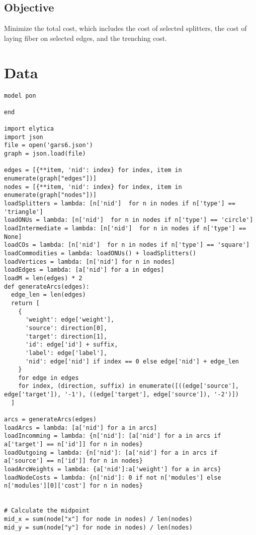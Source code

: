 \documentclass{article}
\begin{document}
\subsection{Objective}
Minimize the total cost, which includes the cost of selected splitters, the cost of laying fiber on selected edges, and the trenching cost.

\section{Data}

\begin{lstlisting}[style=custompython, caption=Python Code for PON Model]
model pon

end

import elytica
import json
file = open('gars6.json')
graph = json.load(file)

edges = [{**item, 'nid': index} for index, item in enumerate(graph["edges"])]
nodes = [{**item, 'nid': index} for index, item in enumerate(graph["nodes"])]
loadSplitters = lambda: [n['nid']  for n in nodes if n['type'] == 'triangle']
loadONUs = lambda: [n['nid']  for n in nodes if n['type'] == 'circle']
loadIntermediate = lambda: [n['nid']  for n in nodes if n['type'] == None]
loadCOs = lambda: [n['nid']  for n in nodes if n['type'] == 'square']
loadCommodities = lambda: loadONUs() + loadSplitters()
loadVertices = lambda: [n['nid'] for n in nodes]
loadEdges = lambda: [a['nid'] for a in edges]
loadM = len(edges) * 2
def generateArcs(edges):
  edge_len = len(edges)
  return [
    {
      'weight': edge['weight'],
      'source': direction[0],
      'target': direction[1],
      'id': edge['id'] + suffix,
      'label': edge['label'],
      'nid': edge['nid'] if index == 0 else edge['nid'] + edge_len
    }
    for edge in edges
    for index, (direction, suffix) in enumerate([((edge['source'], edge['target']), '-1'), ((edge['target'], edge['source']), '-2')])
  ]

arcs = generateArcs(edges)
loadArcs = lambda: [a['nid'] for a in arcs]
loadIncomming = lambda: {n['nid']: [a['nid'] for a in arcs if a['target'] == n['id']] for n in nodes}
loadOutgoing = lambda: {n['nid']: [a['nid'] for a in arcs if a['source'] == n['id']] for n in nodes}
loadArcWeights = lambda: {a['nid']:a['weight'] for a in arcs}
loadNodeCosts = lambda: {n['nid']: 0 if not n['modules'] else n['modules'][0]['cost'] for n in nodes}


# Calculate the midpoint
mid_x = sum(node["x"] for node in nodes) / len(nodes)
mid_y = sum(node["y"] for node in nodes) / len(nodes)


\end{lstlisting}
\end{document}
